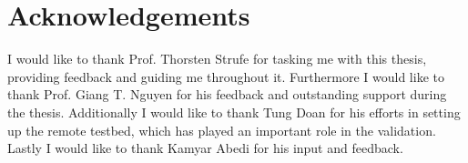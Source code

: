 \chapter*{Acknowledgements}

I would like to thank Prof. Thorsten Strufe for tasking me with this thesis, providing feedback and guiding me throughout it. Furthermore I would like to thank Prof. Giang T. Nguyen for his feedback and outstanding support during the thesis. Additionally I would like to thank Tung Doan for his efforts in setting up the remote testbed, which has played an important role in the validation. Lastly I would like to thank Kamyar Abedi for his input and feedback.